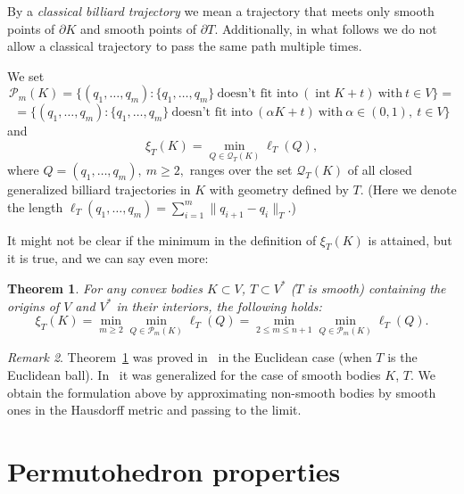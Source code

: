 \documentclass[12pt,a4paper,oneside]{amsart}
\newtheorem{theorem}{Theorem}[section]
\theoremstyle{definition}
\theoremstyle{remark}
\newtheorem{remark}[theorem]{Remark}
\numberwithin{equation}{section}
\DeclareMathOperator{\inte}{int}
\begin{document}
By a \emph{classical billiard trajectory} we mean a trajectory that meets only smooth points of $\partial K$ and smooth points of $\partial T$. Additionally, in what follows we do not allow a classical trajectory to pass the same path multiple times.

We set
$$
\mathcal P_m(K) = \{ (q_1,\ldots, q_m) : \{q_1,\ldots, q_m\} \ \text{doesn't fit into}\ (\inte K + t)\ \text{with} \ t\in V \} =
$$
$$
= \{(q_1,\ldots, q_m) : \{q_1,\ldots, q_m\} \ \text{doesn't fit into}\ (\alpha K+t)\ \text{with}\ \alpha\in (0,1),\ t\in V \}
$$
and
$$
\xi_T(K) = \min_{Q \in \mathcal Q_T(K)} \ell_T(Q),
$$
where $Q = (q_1,\ldots, q_m),\ m \ge 2,$ ranges over the set $\mathcal Q_T(K)$ of all closed generalized billiard trajectories in $K$ with geometry defined by $T$. (Here we denote the length $\ell_T (q_1,\ldots, q_m) = \sum_{i=1}^m \|q_{i+1} - q_i\|_T$.)

It might not be clear if the minimum in the definition of $\xi_T(K)$ is attained, but it is true, and we can say even more:

\begin{theorem}
\label{thm:bezdeks}
For any convex bodies $K \subset V$, $T \subset V^*$ ($T$ is smooth) containing the origins of $V$ and $V^*$ in their interiors, the following holds:
$$
\xi_T(K) = \min_{m\ge 2} \min_{Q\in \mathcal P_m(K)} \ell_T(Q) = \min_{2\le m\le n+1} \min_{Q\in \mathcal P_m(K)} \ell_T(Q).
$$
\end{theorem}

\begin{remark}
\label{rem:xidef}
Theorem~\ref{thm:bezdeks} was proved in~\cite{bezdek2009shortest} in the Euclidean case (when $T$ is the Euclidean ball). In~\cite{akopyan2016elementary} it was generalized for the case of smooth bodies $K$, $T$.
We obtain the formulation above by approximating non-smooth bodies by smooth ones in the Hausdorff metric and passing to the limit.
\end{remark}

\section{Permutohedron properties}
\label{sec:permutohedron}
\end{document}
